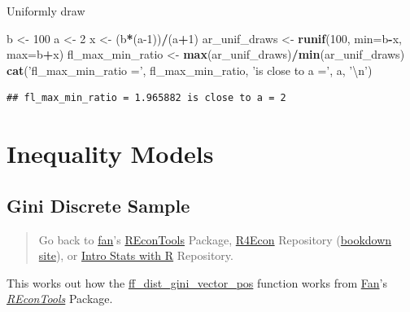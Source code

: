 \documentclass[
]{book}
\newenvironment{Shaded}{\begin{snugshade}}{\end{snugshade}}
\newcommand{\CharTok}[1]{\textcolor[rgb]{0.31,0.60,0.02}{#1}}
\newcommand{\DataTypeTok}[1]{\textcolor[rgb]{0.13,0.29,0.53}{#1}}
\newcommand{\DecValTok}[1]{\textcolor[rgb]{0.00,0.00,0.81}{#1}}
\newcommand{\KeywordTok}[1]{\textcolor[rgb]{0.13,0.29,0.53}{\textbf{#1}}}
\newcommand{\NormalTok}[1]{#1}
\newcommand{\OperatorTok}[1]{\textcolor[rgb]{0.81,0.36,0.00}{\textbf{#1}}}
\newcommand{\StringTok}[1]{\textcolor[rgb]{0.31,0.60,0.02}{#1}}
\begin{document}
Uniformly draw

\begin{Shaded}
\begin{Highlighting}[]
\NormalTok{b <-}\StringTok{ }\DecValTok{100}
\NormalTok{a <-}\StringTok{ }\DecValTok{2}
\NormalTok{x <-}\StringTok{ }\NormalTok{(b}\OperatorTok{*}\NormalTok{(a}\DecValTok{-1}\NormalTok{))}\OperatorTok{/}\NormalTok{(a}\OperatorTok{+}\DecValTok{1}\NormalTok{)}
\NormalTok{ar_unif_draws <-}\StringTok{ }\KeywordTok{runif}\NormalTok{(}\DecValTok{100}\NormalTok{, }\DataTypeTok{min=}\NormalTok{b}\OperatorTok{-}\NormalTok{x, }\DataTypeTok{max=}\NormalTok{b}\OperatorTok{+}\NormalTok{x)}
\NormalTok{fl_max_min_ratio <-}\StringTok{ }\KeywordTok{max}\NormalTok{(ar_unif_draws)}\OperatorTok{/}\KeywordTok{min}\NormalTok{(ar_unif_draws)}
\KeywordTok{cat}\NormalTok{(}\StringTok{'fl_max_min_ratio ='}\NormalTok{, fl_max_min_ratio, }\StringTok{'is close to a ='}\NormalTok{, a, }\StringTok{'}\CharTok{\textbackslash{}n}\StringTok{'}\NormalTok{)}
\end{Highlighting}
\end{Shaded}

\begin{verbatim}
## fl_max_min_ratio = 1.965882 is close to a = 2
\end{verbatim}

\hypertarget{inequality-models}{%
\section{Inequality Models}\label{inequality-models}}

\hypertarget{gini-discrete-sample}{%
\subsection{Gini Discrete Sample}\label{gini-discrete-sample}}

\begin{quote}
Go back to \href{http://fanwangecon.github.io/}{fan}'s \href{https://fanwangecon.github.io/REconTools/}{REconTools} Package, \href{https://fanwangecon.github.io/R4Econ/}{R4Econ} Repository (\href{https://fanwangecon.github.io/R4Econ/bookdown}{bookdown site}), or \href{https://fanwangecon.github.io/Stat4Econ/}{Intro Stats with R} Repository.
\end{quote}

This works out how the \href{https://fanwangecon.github.io/REconTools/reference/ff_dist_gini_vector_pos.html}{ff\_dist\_gini\_vector\_pos} function works from \href{https://fanwangecon.github.io/}{Fan}'s \emph{\href{https://fanwangecon.github.io/REconTools/}{REconTools}} Package.
\end{document}
